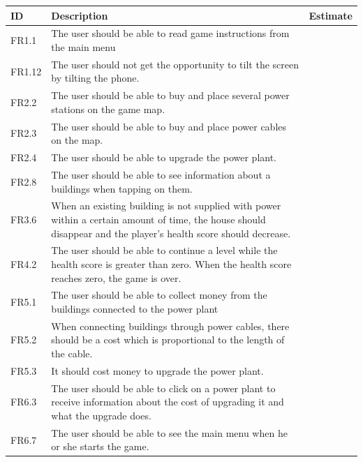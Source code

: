 	\begin{tabular}{| p{1cm} | p{8cm} | p{3cm} |}
		\hline
		\rowcolor{gray}
		ID & Description & Estimate \\ \hline
		FR1.1 & The user should be able to read game instructions from the main menu
		& \\ \hline

		FR1.12 & The user should not get the opportunity to tilt the screen by tilting the phone. & \\ \hline
		
		FR2.2 & The user should be able to buy and place several power stations on the game map.
		& \\ \hline

		FR2.3 & The user should be able to buy and place power cables on the map. &  \\ \hline

		FR2.4 & The user should be able to upgrade the power plant. & \\ \hline

		FR2.8 & The user should be able to see information about a buildings when tapping on them.
		& \\ \hline

		FR3.6 & When an existing building is not supplied with power within a certain amount of time, 
		the house should disappear and the player's health score should decrease. & \\ \hline

		FR4.2 & The user should be able to continue a level while the health score is greater than zero. 
		When the health score reaches zero, the game is over. & \\ \hline

		FR5.1 & The user should be able to collect money from the buildings connected to the power plant
		& \\ \hline

		FR5.2 & When connecting buildings through power cables, there should be a cost which is 
		proportional to the length of the cable. & \\ \hline

		FR5.3 & It should cost money to upgrade the power plant. & \\ \hline

		FR6.3 & The user should be able to click on a power plant to receive information about 
		the cost of upgrading it and what the upgrade does. & \\ \hline

		FR6.7 & The user should be able to see the main menu when he or she starts the game. & \\ \hline


\end{tabular}
